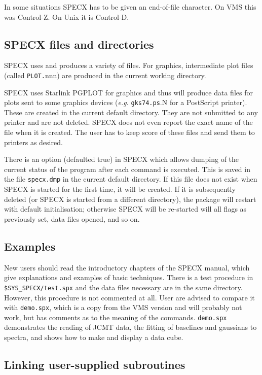In some situations SPECX has to be given an end-of-file character. On
VMS this was Control-Z. On Unix it is Control-D.


\subsection {SPECX files and directories}

SPECX uses and produces a variety of files. For graphics, 
intermediate plot files (called {\tt PLOT.}nnn) are produced in the
current working directory.

SPECX uses Starlink PGPLOT for graphics and thus will produce data files for
plots sent to some graphics devices ({\em e.g.} {\tt gks74.ps}.N for a
PostScript printer). These
are created in the current default directory. They are not submitted to
any printer and are not deleted. SPECX does not even report the exact
name of the file when it is created. The user has to keep score of these
files and send them to printers as desired.

There is an option (defaulted true) in SPECX which  allows dumping of the
current status of the program after each  command is executed. This is saved in
the file {\tt specx.dmp} in the  current default directory. If this file
does not exist when SPECX  is started for the first time, it will be
created. If it is
subsequently deleted (or SPECX is started from a different  directory), the
package will restart with default initialisation; otherwise SPECX will be
re-started will all flags as previously  set, data files opened, and so on. 


\subsection {Examples}

New users should read the introductory chapters of the SPECX manual,
which give explanations and examples of basic techniques. There is a
test procedure in {\tt \$SYS\_SPECX/test.spx} and the data files
necessary are in the same directory. However, this procedure is not
commented at all. User are advised to compare it with {\tt demo.spx},
which is a copy from the VMS version and will probably not work, but has
comments as to the meaning of the commands.
{\tt demo.spx} demonstrates the reading of JCMT data,
the fitting of baselines and gaussians to spectra, and shows how to make
and display a data cube.


\subsection{Linking user-supplied subroutines}

